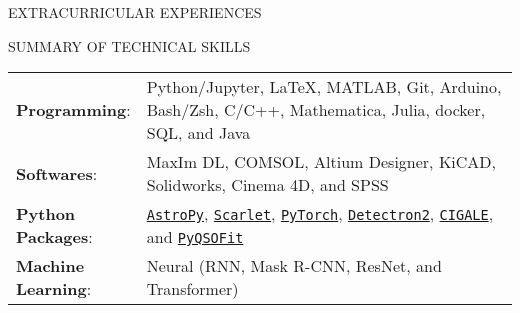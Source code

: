 \documentclass[10pt]{article} %
\begin{document}
\begin{section}{EXTRACURRICULAR EXPERIENCES}

\end{section}

\begin{section}{SUMMARY OF TECHNICAL SKILLS}

\begin{tabular}{@{}p{0.2\linewidth}@{}p{0.8\linewidth}@{}}
    \textbf{Programming}: & Python/Jupyter, \LaTeX, MATLAB, Git, Arduino, Bash/Zsh, C/C++, Mathematica, Julia, docker, SQL, and Java \\
    \textbf{Softwares}: & MaxIm DL, COMSOL, Altium Designer, KiCAD, Solidworks, Cinema 4D, and SPSS \\
    \textbf{Python Packages}: & \href{https://www.astropy.org/}{\texttt{AstroPy}}, \href{https://github.com/pmelchior/scarlet}{\texttt{Scarlet}}, \href{https://pytorch.org/}{\texttt{PyTorch}}, \href{https://github.com/facebookresearch/detectron2}{\texttt{Detectron2}}, \href{https://cigale.lam.fr/}{\texttt{CIGALE}}, and \href{https://github.com/legolason/PyQSOFit}{\texttt{PyQSOFit}} \\
    \textbf{Machine Learning}: & Neural (RNN, Mask R-CNN, ResNet, and Transformer) \\
\end{tabular}
    
    \end{section} 
\end{document}
